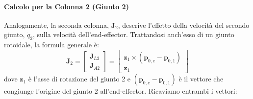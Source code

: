 \documentclass[11pt, a4paper]{report}
\begin{document}
\paragraph{Calcolo per la Colonna 2 (Giunto 2)}
Analogamente, la seconda colonna, \(\bm{J}_2\), descrive l'effetto della velocità del secondo giunto, \(\dot{q}_2\), sulla velocità dell'end-effector. Trattandosi anch'esso di un giunto rotoidale, la formula generale è:
\[ \bm{J}_2 = \begin{bmatrix} \bm{J}_{L2} \\ \bm{J}_{A2} \end{bmatrix} = \begin{bmatrix} \bm{z}_1 \times (\bm{p}_{0,e} - \bm{p}_{0,1}) \\ \bm{z}_1 \end{bmatrix} \]
dove \(\bm{z}_1\) è l'asse di rotazione del giunto 2 e \((\bm{p}_{0,e} - \bm{p}_{0,1})\) è il vettore che congiunge l'origine del giunto 2 all'end-effector. Ricaviamo entrambi i vettori:
\end{document}
